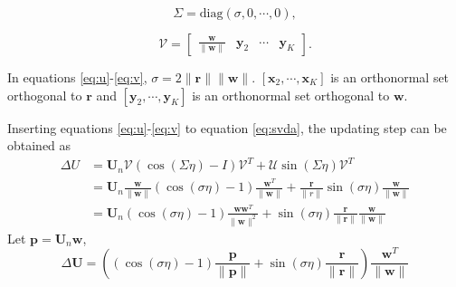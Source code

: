 \begin{equation}
\label{eq:s}
\Sigma=\text{diag}(\sigma,0,\cdots,0),
\end{equation}

\begin{equation}
\label{eq:v}
\mathcal{V}=\left[\begin{array}{cccc}
\frac{\mathbf{w}}{\parallel \mathbf{w} \parallel} & \mathbf{y}_2 & \cdots & \mathbf{y}_K 
\end{array} \right].
\end{equation}

In equations \ref{eq:u}-\ref{eq:v},
$\sigma=2\parallel \mathbf{r} \parallel \parallel \mathbf{w} \parallel$.
$[\mathbf{x}_2,\cdots,\mathbf{x}_K]$ is an orthonormal set orthogonal to $\mathbf{r}$ and 
$[\mathbf{y}_2,\cdots,\mathbf{y}_K]$ is an orthonormal set orthogonal to $\mathbf{w}$.

Inserting equations \ref{eq:u}-\ref{eq:v} to equation \ref{eq:svda}, the updating step can be obtained as
\begin{equation}
\label{eq:up3}
\begin{split}
\Delta U &=\mathbf{U}_{n}\mathcal{V}\left(\cos(\Sigma\eta)-I\right)\mathcal{V}^T +\mathcal{U}\sin(\Sigma\eta)\mathcal{V}^T \\
&=\mathbf{U}_{n} \frac{\mathbf{w}}{\parallel \mathbf{w} \parallel}(\cos(\sigma\eta)-1)\frac{\mathbf{w}^T}{\parallel \mathbf{w} \parallel} + \frac{\mathbf{r}}{\parallel r \parallel}\sin(\sigma\eta) \frac{\mathbf{w}}{\parallel \mathbf{w} \parallel}\\
&=\mathbf{U}_{n}(\cos(\sigma\eta)-1)\frac{\mathbf{w}\mathbf{w}^T}{\parallel \mathbf{w} \parallel^2}+\sin(\sigma\eta)\frac{\mathbf{r}}{\parallel \mathbf{r} \parallel}\frac{\mathbf{w}}{\parallel \mathbf{w} \parallel}
\end{split}
\end{equation}
Let $\mathbf{p}=\mathbf{U}_n\mathbf{w}$, 
\begin{equation}
\label{eq:up4}
\Delta \mathbf{U} = \left((\cos(\sigma\eta)-1)\frac{\mathbf{p}}{\parallel \mathbf{p} \parallel} + \sin(\sigma\eta)\frac{\mathbf{r}}{\parallel \mathbf{r} \parallel}\right) \frac{\mathbf{w}^T}{\parallel \mathbf{w} \parallel}
\end{equation}

